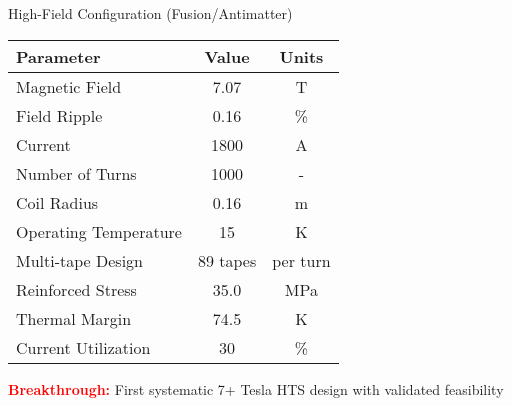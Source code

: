 \documentclass[aspectratio=169,xcolor={table,dvipsnames}]{beamer}
\newcommand{\highlight}[1]{\textcolor{red}{\textbf{#1}}}
\begin{document}
\begin{frame}{High-Field Configuration (Fusion/Antimatter)}
    \begin{table}[h]
        \centering
        \begin{tabular}{lcc}
            \toprule
            \textbf{Parameter} & \textbf{Value} & \textbf{Units} \\
            \midrule
            Magnetic Field & 7.07 & T \\
            Field Ripple & 0.16 & \% \\
            Current & 1800 & A \\
            Number of Turns & 1000 & - \\
            Coil Radius & 0.16 & m \\
            Operating Temperature & 15 & K \\
            Multi-tape Design & 89 tapes & per turn \\
            Reinforced Stress & 35.0 & MPa \\
            Thermal Margin & 74.5 & K \\
            Current Utilization & 30 & \% \\
            \bottomrule
        \end{tabular}
    \end{table}
    
    \highlight{Breakthrough:} First systematic 7+ Tesla HTS design with validated feasibility
\end{frame}
\end{document}
